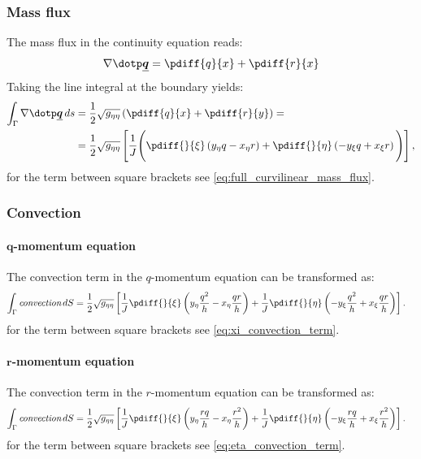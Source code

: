 \subsubsection{Mass flux}
The mass flux in the continuity equation reads:
\begin{align}
    \nabla \dotp \vec{q} = \pdiff{q}{x} + \pdiff{r}{x}
\end{align}
Taking the line integral at the boundary yields:
\begin{align}
    \int_\Gamma \nabla \dotp \vec{q}\, ds & = \half \sqrt{g_{\eta\eta}} \left( \pdiff{q}{x} + \pdiff{r}{y} \right) =
\\
     & = \half \sqrt{g_{\eta\eta}} \left[ \frac{1}{J}\Bigg( \pdiff{}{\xi} \left( y_{\eta} q - x_{\eta} r \right) + \pdiff{}{\eta} \left( -y_{\xi} q + x_{\xi} r \right)\Bigg) \right],
\end{align}
for the term between square brackets see \autoref{eq:full_curvilinear_mass_flux}.
\subsubsection{Convection}
\paragraph*{$\bm q$-momentum equation}
The convection term in the $q$-momentum equation can be transformed as:
\begin{align}
     \int_\Gamma \textit{convection}\, dS &= \half \sqrt{g_{\eta\eta}} \left[\frac{1}{J} \pdiff{}{\xi}\left(y_{\eta} \frac{q^2}{h} - x_{\eta} \frac{qr}{h} \right) + \frac{1}{J} \pdiff{}{\eta}\left(-y_{\xi} \frac{q^2}{h} + x_{\xi} \frac{qr}{h} \right) \right].
\end{align}
for the term between square brackets see \autoref{eq:xi_convection_term}.
\paragraph*{$\bm r$-momentum equation}
The convection term in the $r$-momentum equation can be transformed as:
\begin{align}
     \int_\Gamma \textit{convection} \, dS &= \half \sqrt{g_{\eta\eta}} \left[\frac{1}{J} \pdiff{}{\xi}\left(y_{\eta} \frac{rq}{h} - x_{\eta} \frac{r^2}{h} \right) + \frac{1}{J} \pdiff{}{\eta}\left(-y_{\xi} \frac{rq}{h} + x_{\xi} \frac{r^2}{h} \right) \right].
\end{align}
for the term between square brackets see \autoref{eq:eta_convection_term}.
